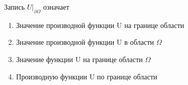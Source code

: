 Запись \(U\vert _{\partial \Omega }\) означает

\begin{enumerate}[label=\arabic*)]
    \item Значение производной функции U на границе области
    \item Значение производной функции U в области \(\Omega\)
    \item Значение функции U на границе области \(\Omega\)
    \item Производную функции U по границе области
\end{enumerate}

